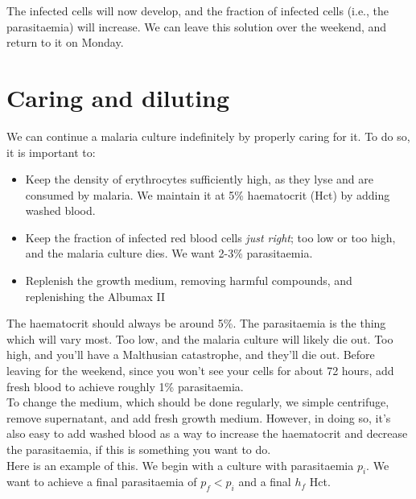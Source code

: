 \documentclass{article}
\begin{document}
The infected cells will now develop, and the fraction of infected cells (i.e., the parasitaemia) will increase. We can leave this solution over the weekend, and return to it on Monday.\\

\newpage
\section{Caring and diluting}

We can continue a malaria culture indefinitely by properly caring for it. To do so, it is important to:

\begin{itemize}
	\item Keep the density of erythrocytes sufficiently high, as they lyse and are consumed by malaria. We maintain it at 5\% haematocrit (Hct) by adding washed blood.
	\item Keep the fraction of infected red blood cells \emph{just right}; too low or too high, and the malaria culture dies. We want 2-3\% parasitaemia.
	\item Replenish the growth medium, removing harmful compounds, and replenishing the Albumax II
\end{itemize}

The haematocrit should always be around 5\%. The parasitaemia is the thing which will vary most. Too low, and the malaria culture will likely die out. Too high, and you'll have a Malthusian catastrophe, and they'll die out. Before leaving for the weekend, since you won't see your cells for about 72 hours, add fresh blood to achieve roughly 1\% parasitaemia.\\

To change the medium, which should be done regularly, we simple centrifuge, remove supernatant, and add fresh growth medium. However, in doing so, it's also easy to add washed blood as a way to increase the haematocrit and decrease the parasitaemia, if this is something you want to do.\\

Here is an example of this. We begin with a culture with parasitaemia $p_i$. We want to achieve a final parasitaemia of $p_f < p_i$ and a final $h_f$ Hct.
\end{document}
